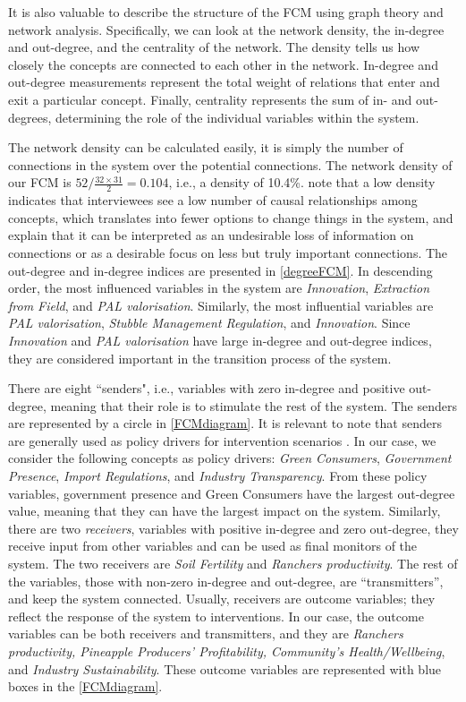 It is also valuable to describe the structure of the FCM using graph theory and network analysis. Specifically, we can look at the network density, the in-degree and out-degree, and the centrality of the network. The density tells us how closely the concepts are connected to each other in the network. In-degree and out-degree measurements represent the total weight of relations that enter and exit a particular concept. Finally, centrality represents the sum of in- and out-degrees, determining the role of the individual variables within the system.

The network density can be calculated easily, it is simply the number of connections in the system over the potential connections. The network density of our FCM is $52/\frac{32\times31}{2}=0.104$, i.e.,  a density of 10.4\%. \cite{ozesmi2004ecological} note that a low density indicates that interviewees see a low number of causal relationships among concepts, which translates into fewer options to change things in the system, and \cite{jetter2014fuzzy} explain that it can be interpreted as an undesirable loss of information on connections or as a desirable focus on less but truly important connections. The out-degree and in-degree indices are presented in \cref{degreeFCM}. In descending order, the most influenced variables in the system are \textit{Innovation}, \textit{Extraction from Field}, and \textit{PAL valorisation}. Similarly, the most influential variables are \textit{PAL valorisation}, \textit{Stubble Management Regulation}, and \textit{Innovation}. Since \textit{Innovation} and \textit{PAL valorisation} have large in-degree and out-degree indices, they are considered important in the transition process of the system.  

There are eight ``senders", i.e., variables with zero in-degree and positive out-degree, meaning that their role is to stimulate the rest of the system. The senders are represented by a circle in \cref{FCMdiagram}. It is relevant to note that senders are generally used as policy drivers for intervention scenarios \citep{morone2021using}.  In our case, we consider the following concepts as policy drivers: \textit{Green Consumers}, \textit{Government Presence}, \textit{Import Regulations}, and \textit{Industry Transparency}. From these policy variables, government presence and Green Consumers have the largest out-degree value, meaning that they can have the largest impact on the system. Similarly, there are two \textit{receivers}, variables with positive in-degree and zero out-degree, they receive input from other variables and can be used as final monitors of the system. The two receivers are \textit{Soil Fertility} and \textit{Ranchers productivity}. The rest of the variables, those with non-zero in-degree and out-degree, are “transmitters”, and keep the system connected. Usually, receivers are outcome variables; they reflect the response of the system to interventions. In our case, the outcome variables can be both receivers and transmitters, and they are \textit{Ranchers productivity, Pineapple Producers' Profitability, Community's Health/Wellbeing}, and \textit{Industry Sustainability}. These outcome variables are represented with blue boxes in the \cref{FCMdiagram}.


